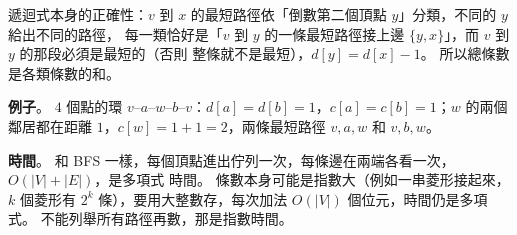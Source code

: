 \begin{pastsoln}
遞迴式本身的正確性：$v$ 到 $x$ 的最短路徑依「倒數第二個頂點 $y$」分類，不同的 $y$ 給出不同的路徑，
每一類恰好是「$v$ 到 $y$ 的一條最短路徑接上邊 $\{y, x\}$」，而 $v$ 到 $y$ 的那段必須是最短的（否則
整條就不是最短），$d[y] = d[x] - 1$。 所以總條數是各類條數的和。

\textbf{例子}。 $4$ 個點的環 $v$--$a$--$w$--$b$--$v$：$d[a] = d[b] = 1$，$c[a] = c[b] = 1$；$w$ 的兩個
鄰居都在距離 $1$，$c[w] = 1 + 1 = 2$，兩條最短路徑 $v, a, w$ 和 $v, b, w$。

\textbf{時間}。 和 BFS 一樣，每個頂點進出佇列一次，每條邊在兩端各看一次，$O(|V| + |E|)$，是多項式
時間。 條數本身可能是指數大（例如一串菱形接起來，$k$ 個菱形有 $2^k$ 條），要用大整數存，每次加法
$O(|V|)$ 個位元，時間仍是多項式。 不能列舉所有路徑再數，那是指數時間。
\end{pastsoln}

